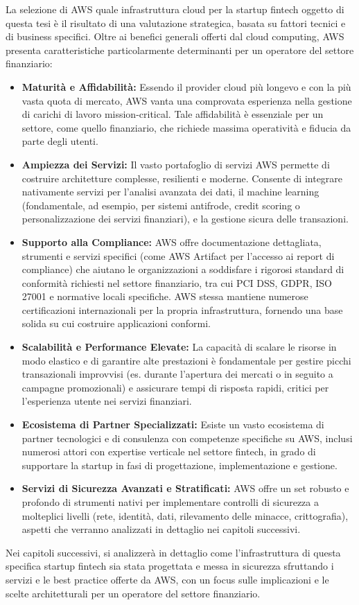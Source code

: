 La selezione di AWS quale infrastruttura cloud per la startup fintech oggetto di questa tesi è il risultato di una valutazione strategica, basata su fattori tecnici e di business specifici. Oltre ai benefici generali offerti dal cloud computing, AWS presenta caratteristiche particolarmente determinanti per un operatore del settore finanziario:
\begin{itemize}
    \item \textbf{Maturità e Affidabilità:} Essendo il provider cloud più longevo e con la più vasta quota di mercato, AWS vanta una comprovata esperienza nella gestione di carichi di lavoro mission-critical. Tale affidabilità è essenziale per un settore, come quello finanziario, che richiede massima operatività e fiducia da parte degli utenti.
    \item \textbf{Ampiezza dei Servizi:} Il vasto portafoglio di servizi AWS permette di costruire architetture complesse, resilienti e moderne. Consente di integrare nativamente servizi per l'analisi avanzata dei dati, il machine learning (fondamentale, ad esempio, per sistemi antifrode, credit scoring o personalizzazione dei servizi finanziari), e la gestione sicura delle transazioni.
    \item \textbf{Supporto alla Compliance:} AWS offre documentazione dettagliata, strumenti e servizi specifici (come AWS Artifact per l'accesso ai report di compliance) che aiutano le organizzazioni a soddisfare i rigorosi standard di conformità richiesti nel settore finanziario, tra cui PCI DSS, GDPR, ISO 27001 e normative locali specifiche. AWS stessa mantiene numerose certificazioni internazionali per la propria infrastruttura, fornendo una base solida su cui costruire applicazioni conformi.
    \item \textbf{Scalabilità e Performance Elevate:} La capacità di scalare le risorse in modo elastico e di garantire alte prestazioni è fondamentale per gestire picchi transazionali improvvisi (es. durante l'apertura dei mercati o in seguito a campagne promozionali) e assicurare tempi di risposta rapidi, critici per l'esperienza utente nei servizi finanziari.
    \item \textbf{Ecosistema di Partner Specializzati:} Esiste un vasto ecosistema di partner tecnologici e di consulenza con competenze specifiche su AWS, inclusi numerosi attori con expertise verticale nel settore fintech, in grado di supportare la startup in fasi di progettazione, implementazione e gestione.
    \item \textbf{Servizi di Sicurezza Avanzati e Stratificati:} AWS offre un set robusto e profondo di strumenti nativi per implementare controlli di sicurezza a molteplici livelli (rete, identità, dati, rilevamento delle minacce, crittografia), aspetti che verranno analizzati in dettaglio nei capitoli successivi.
\end{itemize}
Nei capitoli successivi, si analizzerà in dettaglio come l'infrastruttura di questa specifica startup fintech sia stata progettata e messa in sicurezza sfruttando i servizi e le best practice offerte da AWS, con un focus sulle implicazioni e le scelte architetturali per un operatore del settore finanziario.

